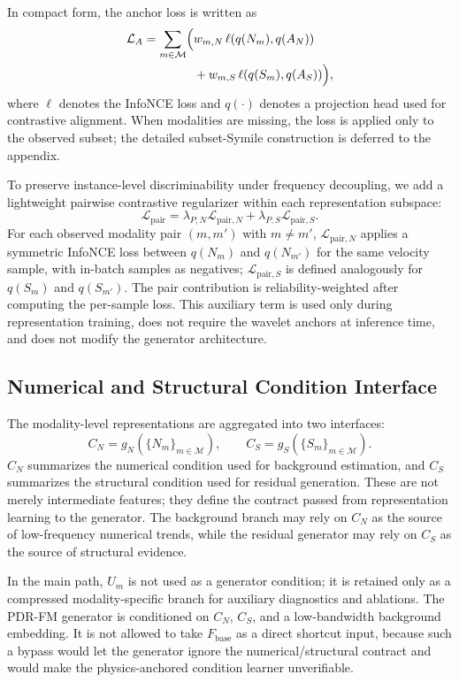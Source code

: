 \documentclass[letterpaper]{article}
\begin{document}
In compact form, the anchor loss is written as
\begin{align}
\mathcal L_A
=
\sum_{m\in\mathcal M}
\Bigl(
&w_{m,N}\,\ell(q(N_m),q(A_N))
\nonumber\\
&+w_{m,S}\,\ell(q(S_m),q(A_S))
\Bigr),
\end{align}
where $\ell$ denotes the InfoNCE loss and $q(\cdot)$ denotes a projection head used for contrastive alignment. When modalities are missing, the loss is applied only to the observed subset; the detailed subset-Symile construction is deferred to the appendix.

To preserve instance-level discriminability under frequency decoupling, we add a lightweight pairwise contrastive regularizer within each representation subspace:
\begin{equation}
\mathcal L_{\mathrm{pair}}
=
\lambda_{P,N}\mathcal L_{\mathrm{pair},N}
+
\lambda_{P,S}\mathcal L_{\mathrm{pair},S}.
\end{equation}
For each observed modality pair $(m,m')$ with $m\ne m'$, $\mathcal L_{\mathrm{pair},N}$ applies a symmetric InfoNCE loss between $q(N_m)$ and $q(N_{m'})$ for the same velocity sample, with in-batch samples as negatives; $\mathcal L_{\mathrm{pair},S}$ is defined analogously for $q(S_m)$ and $q(S_{m'})$. The pair contribution is reliability-weighted after computing the per-sample loss. This auxiliary term is used only during representation training, does not require the wavelet anchors at inference time, and does not modify the generator architecture.

\subsection{Numerical and Structural Condition Interface}
The modality-level representations are aggregated into two interfaces:
\begin{equation}
C_N=g_N(\{N_m\}_{m\in\mathcal M}),\qquad
C_S=g_S(\{S_m\}_{m\in\mathcal M}).
\end{equation}
$C_N$ summarizes the numerical condition used for background estimation, and $C_S$ summarizes the structural condition used for residual generation. These are not merely intermediate features; they define the contract passed from representation learning to the generator. The background branch may rely on $C_N$ as the source of low-frequency numerical trends, while the residual generator may rely on $C_S$ as the source of structural evidence.

In the main path, $U_m$ is not used as a generator condition; it is retained only as a compressed modality-specific branch for auxiliary diagnostics and ablations. The PDR-FM generator is conditioned on $C_N$, $C_S$, and a low-bandwidth background embedding. It is not allowed to take $F_{\mathrm{base}}$ as a direct shortcut input, because such a bypass would let the generator ignore the numerical/structural contract and would make the physics-anchored condition learner unverifiable.
\end{document}
